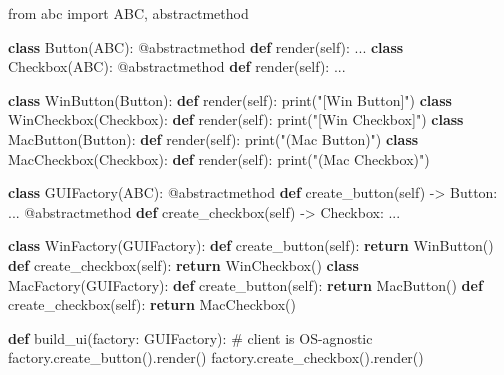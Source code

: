 \documentclass[11pt]{article}
\newenvironment{Shaded}{\begin{snugshade}}{\end{snugshade}}
\newcommand{\AttributeTok}[1]{\textcolor[rgb]{0.16,0.50,0.73}{#1}}
\newcommand{\BuiltInTok}[1]{\textcolor[rgb]{0.50,0.55,0.55}{#1}}
\newcommand{\CommentTok}[1]{\textcolor[rgb]{0.48,0.49,0.49}{#1}}
\newcommand{\ControlFlowTok}[1]{\textcolor[rgb]{0.99,0.74,0.29}{\textbf{#1}}}
\newcommand{\ImportTok}[1]{\textcolor[rgb]{0.15,0.68,0.38}{#1}}
\newcommand{\KeywordTok}[1]{\textcolor[rgb]{0.81,0.81,0.76}{\textbf{#1}}}
\newcommand{\NormalTok}[1]{\textcolor[rgb]{0.81,0.81,0.76}{#1}}
\newcommand{\OperatorTok}[1]{\textcolor[rgb]{0.81,0.81,0.76}{#1}}
\newcommand{\StringTok}[1]{\textcolor[rgb]{0.96,0.31,0.31}{#1}}
\newcommand{\VariableTok}[1]{\textcolor[rgb]{0.15,0.68,0.68}{#1}}
\begin{document}
\begin{Shaded}
\begin{Highlighting}[]
\ImportTok{from}\NormalTok{ abc }\ImportTok{import}\NormalTok{ ABC, abstractmethod}

\KeywordTok{class}\NormalTok{ Button(ABC):}
    \AttributeTok{@abstractmethod}
    \KeywordTok{def}\NormalTok{ render(}\VariableTok{self}\NormalTok{): ...}
\KeywordTok{class}\NormalTok{ Checkbox(ABC):}
    \AttributeTok{@abstractmethod}
    \KeywordTok{def}\NormalTok{ render(}\VariableTok{self}\NormalTok{): ...}

\KeywordTok{class}\NormalTok{ WinButton(Button):}
    \KeywordTok{def}\NormalTok{ render(}\VariableTok{self}\NormalTok{): }\BuiltInTok{print}\NormalTok{(}\StringTok{"[Win Button]"}\NormalTok{)}
\KeywordTok{class}\NormalTok{ WinCheckbox(Checkbox):}
    \KeywordTok{def}\NormalTok{ render(}\VariableTok{self}\NormalTok{): }\BuiltInTok{print}\NormalTok{(}\StringTok{"[Win Checkbox]"}\NormalTok{)}
\KeywordTok{class}\NormalTok{ MacButton(Button):}
    \KeywordTok{def}\NormalTok{ render(}\VariableTok{self}\NormalTok{): }\BuiltInTok{print}\NormalTok{(}\StringTok{"(Mac Button)"}\NormalTok{)}
\KeywordTok{class}\NormalTok{ MacCheckbox(Checkbox):}
    \KeywordTok{def}\NormalTok{ render(}\VariableTok{self}\NormalTok{): }\BuiltInTok{print}\NormalTok{(}\StringTok{"(Mac Checkbox)"}\NormalTok{)}

\KeywordTok{class}\NormalTok{ GUIFactory(ABC):}
    \AttributeTok{@abstractmethod}
    \KeywordTok{def}\NormalTok{ create\_button(}\VariableTok{self}\NormalTok{) }\OperatorTok{{-}\textgreater{}}\NormalTok{ Button: ...}
    \AttributeTok{@abstractmethod}
    \KeywordTok{def}\NormalTok{ create\_checkbox(}\VariableTok{self}\NormalTok{) }\OperatorTok{{-}\textgreater{}}\NormalTok{ Checkbox: ...}

\KeywordTok{class}\NormalTok{ WinFactory(GUIFactory):}
    \KeywordTok{def}\NormalTok{ create\_button(}\VariableTok{self}\NormalTok{): }\ControlFlowTok{return}\NormalTok{ WinButton()}
    \KeywordTok{def}\NormalTok{ create\_checkbox(}\VariableTok{self}\NormalTok{): }\ControlFlowTok{return}\NormalTok{ WinCheckbox()}
\KeywordTok{class}\NormalTok{ MacFactory(GUIFactory):}
    \KeywordTok{def}\NormalTok{ create\_button(}\VariableTok{self}\NormalTok{): }\ControlFlowTok{return}\NormalTok{ MacButton()}
    \KeywordTok{def}\NormalTok{ create\_checkbox(}\VariableTok{self}\NormalTok{): }\ControlFlowTok{return}\NormalTok{ MacCheckbox()}

\KeywordTok{def}\NormalTok{ build\_ui(factory: GUIFactory):       }\CommentTok{\# client is OS{-}agnostic}
\NormalTok{    factory.create\_button().render()}
\NormalTok{    factory.create\_checkbox().render()}
\end{Highlighting}
\end{Shaded}
\end{document}
